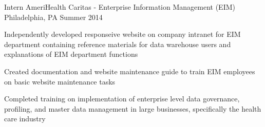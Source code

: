\begin{cventries}
  \cventry
    {Intern} %
    {AmeriHealth Caritas - Enterprise Information Management (EIM)} %
    {Philadelphia, PA} %
    {Summer 2014} %
    {
      \begin{cvitems} %
        \item {Independently developed responseive website on company intranet for EIM department containing reference materials for data warehouse users and explanations of EIM department functions}
        \item {Created documentation and website maintenance guide to train EIM employees on basic website maintenance tasks}
        \item {Completed training on implementation of enterprise level data governance, profiling, and master data management in large businesses, specifically the health care industry}
      \end{cvitems}
    }

\end{cventries}
